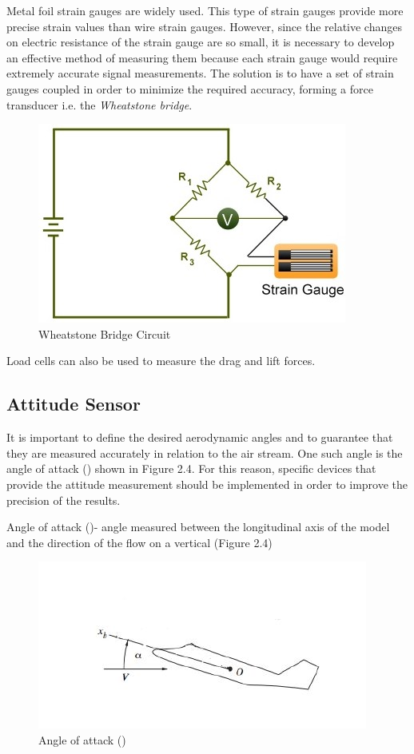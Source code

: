 Metal foil strain gauges are widely used. This type of strain gauges provide more precise strain values than wire strain gauges. However, since the relative changes on electric resistance of the strain gauge are so small, it is necessary to develop an effective method of measuring them because each strain gauge would require extremely accurate signal measurements. The solution is to have a set of strain gauges coupled in order to minimize the required accuracy, forming a force transducer i.e. the \textit{Wheatstone bridge}.
\begin{center}
		\begin{figure}[H]
		\centering
		\includegraphics[width=0.6\linewidth]{Figures/Fig9}
		\caption[Wheatstone Bridge Circuit]{Wheatstone Bridge Circuit \cite{ferreira2015design}}
		\end{figure}
\end{center}
Load cells can also be used to measure the drag and lift forces\cite{ferreira2015design}.
\subsection{Attitude Sensor}
It is important to define the desired aerodynamic angles and to guarantee that they are measured accurately in relation to the air stream. One such angle is the angle of attack (\textalpha) shown in Figure 2.4. For this reason, specific devices that provide the attitude measurement should be implemented in order to improve the precision of the results.

Angle of attack (\textalpha)- angle measured between the longitudinal axis of the model and the direction of the flow on a vertical (Figure 2.4)
\begin{center}
	\begin{figure}[H]
	\centering
	\includegraphics[width=0.6\linewidth]{Figures/Fig10}
	\caption[Angle of attack]{Angle of attack (\textalpha) \cite{ferreira2015design}}
	\end{figure}
\end{center}
